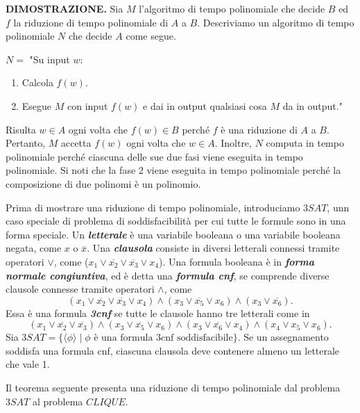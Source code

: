 \documentclass{article}
\begin{document}
\text{}
\newline
\textbf{DIMOSTRAZIONE.} 
Sia $M$ l'algoritmo di tempo polinomiale che decide $B$ ed $f$ la riduzione di tempo polinomiale di $A$ a $B$. 
Descriviamo un algoritmo di tempo polinomiale $N$ che decide $A$ come segue.

\text{}
\newline
$N =$ "Su input $w$:
\begin{enumerate}
    \item Calcola $f(w)$.
    \item Esegue $M$ con input $f(w)$ e dai in output qualsiasi cosa $M$ da in output."
\end{enumerate}
Risulta $w \in A$ ogni volta che $f(w) \in B$ perché $f$ è una riduzione di $A$ a
$B$. Pertanto, $M$ accetta $f(w)$ ogni volta che $w \in A$. 
Inoltre, $N$ computa in tempo polinomiale perché ciascuna delle sue due fasi viene eseguita in tempo polinomiale. 
Si noti che la fase 2 viene eseguita in tempo polinomiale perché la composizione di due polinomi è un polinomio.

\text{}
\newline
Prima di mostrare una riduzione di tempo polinomiale, introduciamo $3SAT$, unn caso speciale di problema di soddisfacibilità per cui tutte le formule sono in una forma speciale.
Un \textit{\textbf{letterale}} è una variabile booleana o una variabile booleana negata, come $x$ o $\overline{x}$. 
Una \textit{\textbf{clausola}} consiste in diversi letterali connessi tramite operatori $\lor$, come ($x_1 \lor \overline{x_2} \lor \overline{x_3} \lor x_4$).
Una formula booleana è in \textit{\textbf{forma normale congiuntiva}}, ed è detta una \textit{\textbf{formula cnf}}, se comprende diverse clausole connesse tramite operatori $\land$, come
$$
(x_1 \lor \overline{x_2} \lor \overline{x_3} \lor x_4) \land (x_3 \lor \overline{x_5} \lor x_6) \land (x_3 \lor \overline{x_6}).
$$
Essa è una formula \textit{\textbf{3cnf}} se tutte le clausole hanno tre letterali come in 
$$
(x_1 \lor \overline{x_2} \lor \overline{x_3}) \land (x_3 \lor \overline{x_5} \lor x_6) \land (x_3 \lor \overline{x_6} \lor x_4) \land (x_4 \lor x_5 \lor x_6).
$$
Sia $3SAT = \{ \langle \phi \rangle \mid \phi \text{ è una formula 3cnf soddisfacibile} \}$.
Se un assegnamento soddisfa una formula cnf, ciascuna clausola deve contenere almeno un letterale che vale 1.

Il teorema seguente presenta una riduzione di tempo polinomiale dal problema $3SAT$ al problema $CLIQUE$.

\text{}
\newline
\end{document}
